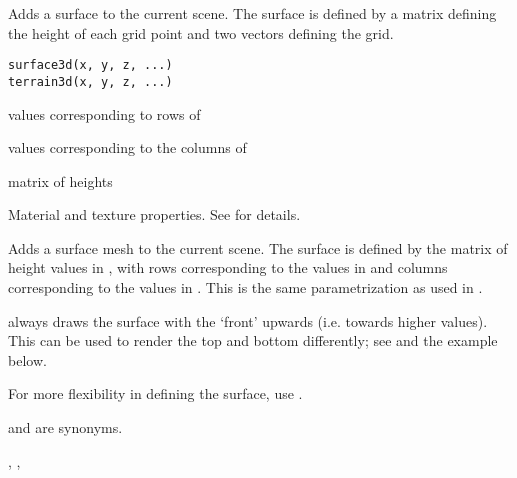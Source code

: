 \begin{Description}\relax
Adds a surface to the current scene. The surface is defined by 
a matrix defining the height of each grid point and two vectors
defining the grid.
\end{Description}
\begin{Usage}
\begin{verbatim}
surface3d(x, y, z, ...)
terrain3d(x, y, z, ...)
\end{verbatim}
\end{Usage}
\begin{Arguments}
\begin{ldescription}
\item[\code{ x }] values corresponding to rows of 

\item[\code{ y }] values corresponding to the columns of 

\item[\code{ z }] matrix of heights

\item[\code{ ... }] Material and texture properties. See  for details.
\end{ldescription}
\end{Arguments}
\begin{Details}\relax
Adds a surface mesh to the current scene. The surface is defined by 
the matrix of height values in , with rows corresponding 
to the values in  and columns corresponding to the values in 
.  This is the same parametrization as used in .

 always draws the surface with the `front' upwards
(i.e. towards higher  values).  This can be used to render
the top and bottom differently; see  and
the example below.

For more flexibility in defining the surface, use .

 and  are synonyms.
\end{Details}
\begin{SeeAlso}\relax
{}, , 
\end{SeeAlso}
